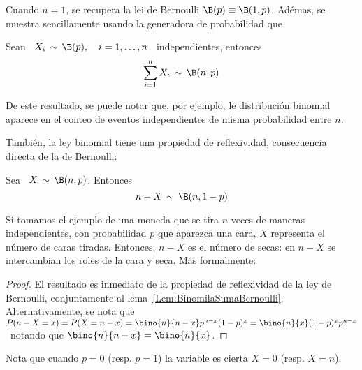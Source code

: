 
Cuando  $n  = 1$,  se  recupera  la lei  de  Bernoulli  $\B(p) \equiv  \B(1,p)$.
Ad\'emas, se muestra  sencillamente usando la generadora de  probabilidad que
%
\begin{lema}
\label{Lem:BinomialSumaBernoulli}
%
  Sean \  $X_i \,  \sim \, \B(p),  \quad i  = 1, \ldots  , n$  \ independientes,
  entonces
  \[
  \sum_{i=1}^n X_i \, \sim \, \B(n,p)
  \]
\end{lema}
%
De este resultado,  se puede notar que, por  ejemplo, le distribuci\'on binomial
aparece en el conteo de eventos independientes de misma probabilidad entre $n$.

Tambi\'en,  la ley binomial  tiene una  propiedad de  reflexividad, consecuencia
directa de la de Bernoulli:
%
\begin{lema}[Reflexividad]
\label{Lem:MP:ReflexividadBinomial}
%
  Sea \ $X \, \sim \, \B(n,p)$. Entonces
  \[
  n-X \, \sim \, \B(n,1-p)
  \]
\end{lema}
%
Si  tomamos  el  ejemplo  de  una  moneda  que se  tira  $n$  veces  de  maneras
independientes, con  probabilidad $p$ que  aparezca una cara, $X$  representa el
n\'umero de caras tiradas. Entonces, $n-X$  es el n\'umero de secas: en $n-X$ se
intercambian los roles de la cara y seca. M\'as formalmente:
%
\begin{proof}
  El  resultado es  inmediato  de la  propiedad  de reflexividad  de  la ley  de
  Bernoulli,                           conjuntamente                          al
  lema~\ref{Lem:BinomilaSumaBernoulli}. Alternativamente,  se nota que  $P(n-X =
  x) = P(X = n-x) = \bino{n}{n-x} p^{n-x} (1-p)^x = \bino{n}{x} (1-p)^x p^{n-x}$
  \ notando que $\bino{n}{n-x} = \bino{n}{x}$.
\end{proof}

Nota que cuando $p = 0$ (resp. $p = 1$) la variable es cierta $X = 0$ (resp.  $X
= n$).
